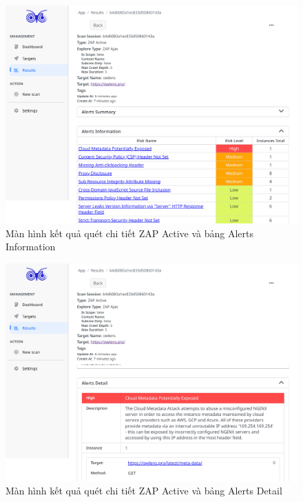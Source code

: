 \begin{figure}[H]
      \centering
      \includegraphics[width=\textwidth]{applied-thesis-chapters/chapter-6/Màn hình kết quả quét chi tiết ZAP Active và bảng Alerts Information.png}
      \caption{Màn hình kết quả quét chi tiết ZAP Active và bảng Alerts Information}
      \label{fig:ManHinhKetQuaQuetChiTietActiveVaAlertsInformation}
\end{figure}

\begin{figure}[H]
      \centering
      \includegraphics[width=\textwidth]{applied-thesis-chapters/chapter-6/Màn hình kết quả quét chi tiết ZAP Active và bảng Alerts Detail.png}
      \caption{Màn hình kết quả quét chi tiết ZAP Active và bảng Alerts Detail}
      \label{fig:ManHinhKetQuaQuetChiTietActiveVaAlertsDetail}
\end{figure}

